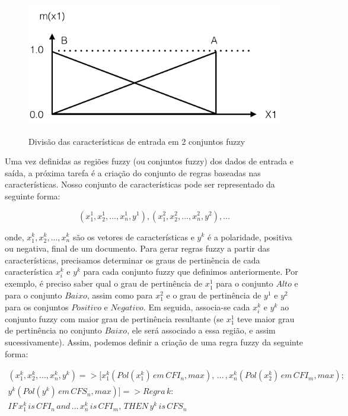 \begin{figure}[h]
\caption{Divisão das características de entrada em 2 conjuntos fuzzy}
\centering
\includegraphics[scale=0.45]{conjuntos_fuzzy_entrada_final.png}
\label{figura:conjuntos_fuzzy_entrada_final}
\end{figure}

Uma vez definidas as regiões fuzzy (ou conjuntos fuzzy) dos dados de entrada e saída, a próxima tarefa é a criação do conjunto de regras baseadas nas características. Nosso conjunto de características pode ser representado da seguinte forma:

\begin{equation}
( x_1^1, x_2^1, ... , x_n^1, y^1), ( x_1^2, x_2^2, ... , x_n^2, y^2), ...
\label{eq:repr_feat}
\end{equation}

onde, $x_1^k, x_2^k, ... , x_n^k$ são os vetores de características e $y^k$ é a polaridade, positiva ou negativa, final de um documento. Para gerar regras fuzzy a partir das  características, precisamos determinar os graus de pertinência de cada característica $x_i^k$ e $y^k$ para cada conjunto fuzzy que definimos anteriormente. Por exemplo, é preciso saber qual o grau de pertinência de $x_1^1$ para o conjunto $Alto$ e para o conjunto $Baixo$, assim como para $x_1^2$ e o grau de pertinência de $y^1$ e $y^2$ para os conjuntos $Positivo$ e $Negativo$. Em seguida, associa-se cada $x_i^k$ e $y^k$ ao conjunto fuzzy com maior grau de pertinência resultante (se $x_1^1$ teve maior grau de pertinência no conjunto $Baixo$, ele será associado a essa região, e assim sucessivamente). Assim, podemos definir a criação de uma regra fuzzy da seguinte forma:

\begin{equation}
\begin{split}
( x_1^k, x_2^k, ... , x_n^k, y^k) => [x_1^k (Pol(x_1^k) \, em \, CFI_n, max), \, ... \, , x_n^k (Pol(x_2^k) \, em \, CFI_m, max); \\
y^k(Pol(y^k) \, em \, CFS_n, max)] => Regra \, k: \\ IF \, x_1^k \, is \, CFI_n \, and \, ... \, x_n^k \, is \, CFI_m, \, THEN \, y^k \, is \, CFS_n
\label{eq:repr_fuzzy_rule}
\end{split}
\end{equation}

